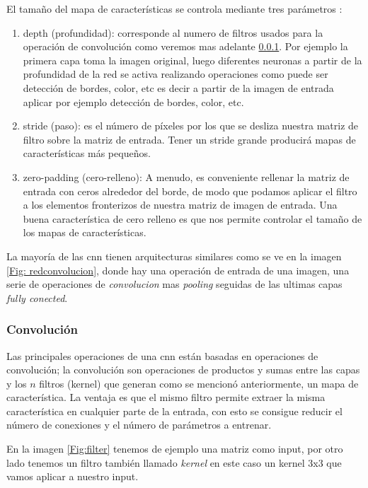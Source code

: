 El tamaño del mapa de características se controla mediante tres parámetros \citep{cnnsarticle}:
\begin{enumerate}
\item depth (profundidad): corresponde al numero de filtros usados para la operación de convolución como veremos mas adelante \ref{sub:convolucion}. Por ejemplo la primera capa toma la imagen original, luego diferentes neuronas a partir de la profundidad de la red se activa realizando operaciones como puede ser detección de bordes, color, etc
es decir a partir de la imagen de entrada aplicar por ejemplo detección de bordes, color, etc.
\item stride (paso): es el número de píxeles por los que se desliza nuestra matriz de filtro sobre la matriz de entrada. Tener un stride grande producirá mapas de características más pequeños.
\item zero-padding (cero-relleno): A menudo, es conveniente rellenar la matriz de entrada con ceros alrededor del borde, de modo que podamos aplicar el filtro a los elementos fronterizos de nuestra matriz de imagen de entrada. Una buena característica de cero relleno es que nos permite controlar el tamaño de los mapas de características.
\end{enumerate}

La mayoría de las \ac{cnn} tienen arquitecturas similares como se ve en la imagen \ref{Fig: redconvolucion}, donde hay una operación de entrada de una imagen, una serie de operaciones de  \textit{convolucion} mas  \textit{pooling} seguidas de las ultimas capas \textit{fully conected}. 

\subsubsection{Convolución}\label{sub:convolucion}
Las principales operaciones de una \ac{cnn} están basadas en operaciones de convolución; la convolución son operaciones de productos y sumas entre las capas y los $n $ filtros (kernel) que generan como se mencionó anteriormente, un mapa de característica. La ventaja es que el mismo filtro permite extraer la misma característica en cualquier parte de la entrada, con esto se consigue reducir el número de conexiones y el número de parámetros a entrenar.

En la imagen \ref{Fig:filter} tenemos de ejemplo una matriz como input, por otro lado tenemos un filtro también llamado \textit{kernel} en este caso un kernel 3x3 que vamos aplicar a nuestro input.

